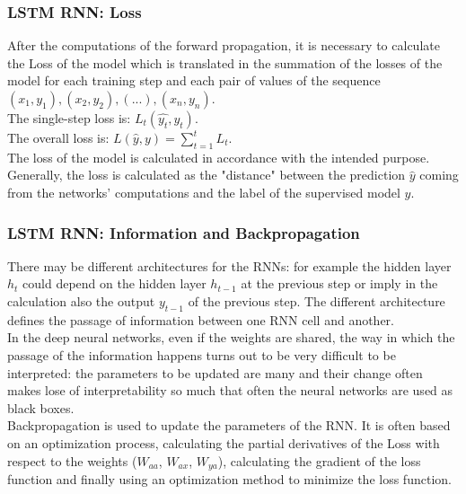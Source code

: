 \documentclass[aspectratio=1610]{beamer}
\begin{document}
\begin{frame}
\frametitle{LSTM RNN: Loss}
After the computations of the forward propagation, it is necessary to calculate the Loss of the model which is translated in the summation of the losses of the model for each training step and each pair of values of the sequence $(x_1, y_1), (x_2, y_2), (...), (x_n, y_n)$.\\
The single-step loss is: $L_t(\hat{y_t}, y_t)$.\\
The overall loss is: $L(\hat{y},y) = \sum_{t=1}^t L_t$.
\\The loss of the model is calculated in accordance with the intended purpose. Generally, the loss is calculated as the "distance" between the prediction $\hat{y}$ coming from the networks' computations and the label of the supervised model $y$.
\end{frame}
\begin{frame}
\frametitle{LSTM RNN: Information and Backpropagation}	
There may be different architectures for the RNNs: for example the hidden layer $h_t$ could depend on the hidden layer $h_{t-1}$ at the previous step or imply in the calculation also the output $y_{t-1}$ of the previous step. The different architecture defines the passage of information between one RNN cell and another.\\
In the deep neural networks, even if the weights are shared, the way in which the passage of the information happens turns out to be very difficult to be interpreted: the parameters to be updated are many and their change often makes lose of interpretability so much that often the neural networks are used as black boxes.\\
Backpropagation is used to update the parameters of the RNN. It is often based on an optimization process, calculating the partial derivatives of the Loss with respect to the weights ($W_{aa}$, $W_{ax}$, $W_{ya}$), calculating the gradient of the loss function and finally using an optimization method to minimize the loss function. 
\end{frame}
\end{document}
